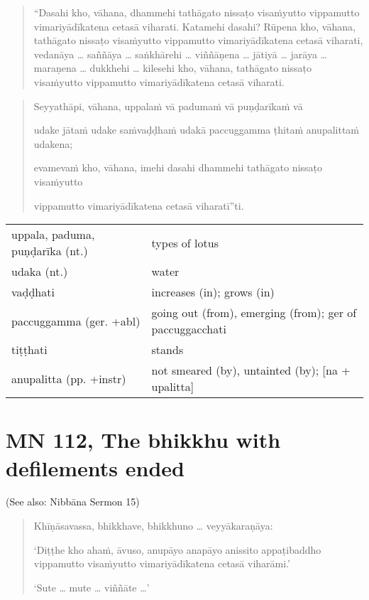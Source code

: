 \documentclass[11pt,oneside]{memoir}
\begin{document}
\begin{quote}
“Dasahi kho, vāhana, dhammehi tathāgato nissaṭo visaṁyutto vippamutto vimariyādīkatena
cetasā viharati. Katamehi dasahi? Rūpena kho, vāhana, tathāgato nissaṭo visaṁyutto
vippamutto vimariyādīkatena cetasā viharati, vedanāya \ldots{} saññāya \ldots{} saṅkhārehi \ldots{} viññāṇena
\ldots{} jātiyā \ldots{} jarāya \ldots{} maraṇena \ldots{} dukkhehi \ldots{} kilesehi kho, vāhana, tathāgato nissaṭo
visaṁyutto vippamutto vimariyādīkatena cetasā viharati.
\end{quote}

\clearpage
\casesLegendHeaderBGHere

\begin{quote}
Seyyathāpi, vāhana, uppalaṁ vā padumaṁ vā puṇḍarīkaṁ vā

udake jātaṁ udake saṁvaḍḍhaṁ udakā paccuggamma ṭhitaṁ anupalittaṁ udakena;

evamevaṁ kho, vāhana, imehi dasahi dhammehi tathāgato nissaṭo visaṁyutto

vippamutto vimariyādīkatena cetasā viharatī”ti.
\end{quote}

\begin{longtable}{L{\colOne} L{\colTwo}}
uppala, paduma, puṇḍarīka (nt.) & types of lotus\\[0pt]
udaka (nt.) & water\\[0pt]
vaḍḍhati & increases (in); grows (in)\\[0pt]
paccuggamma (ger. +abl) & going out (from), emerging (from); ger of paccuggacchati\\[0pt]
tiṭṭhati & stands\\[0pt]
anupalitta (pp. +instr) & not smeared (by), untainted (by); [na + upalitta]\\[0pt]
\end{longtable}

\section{MN 112, The bhikkhu with defilements ended}
\label{sec:orgfae9ebe}

(See also: Nibbāna Sermon 15)

\begin{quote}
Khīṇāsavassa, bhikkhave, bhikkhuno \ldots{} veyyākaraṇāya:

`Diṭṭhe kho ahaṁ, āvuso, anupāyo anapāyo anissito appaṭibaddho vippamutto
visaṁyutto vimariyādīkatena cetasā viharāmi.'

`Sute \ldots{} mute \ldots{} viññāte \ldots{}'
\end{quote}
\end{document}
